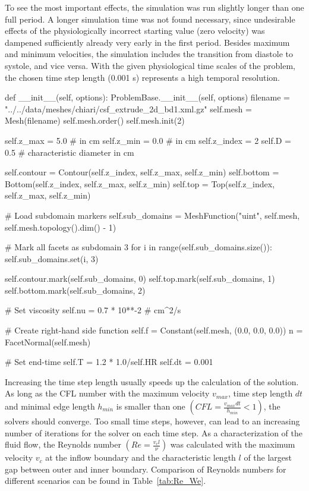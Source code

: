 To see the most important effects, the simulation was run slightly
longer than one full period. A longer simulation time was not found
necessary, since undesirable effects of the physiologically incorrect
starting value (zero velocity) was dampened sufficiently already very
early in the first period. Besides maximum and minimum velocities, the
simulation includes the transition from diastole to systole, and vice
versa.  With the given physiological time scales of the problem, the
chosen time step length (0.001 s) represents a high temporal
resolution.
\begin{python}
def __init__(self, options):
	ProblemBase.__init__(self, options)
	filename = "../../data/meshes/chiari/csf_extrude_2d_bd1.xml.gz"
	self.mesh = Mesh(filename)
	self.mesh.order()
	self.mesh.init(2)

	self.z_max = 5.0	# in cm
	self.z_min = 0.0	# in cm
	self.z_index = 2
	self.D = 0.5 		# characteristic diameter in cm

	self.contour = Contour(self.z_index, self.z_max, self.z_min)
	self.bottom = Bottom(self.z_index, self.z_max, self.z_min)
	self.top = Top(self.z_index, self.z_max, self.z_min)

	# Load subdomain markers
	self.sub_domains = MeshFunction("uint", self.mesh, self.mesh.topology().dim() - 1)

	# Mark all facets as subdomain 3
	for i in range(self.sub_domains.size()):
		self.sub_domains.set(i, 3)

	self.contour.mark(self.sub_domains, 0)
	self.top.mark(self.sub_domains, 1)
	self.bottom.mark(self.sub_domains, 2)

	# Set viscosity
	self.nu = 0.7 * 10**-2 # cm^2/s

	# Create right-hand side function
	self.f = Constant(self.mesh, (0.0, 0.0, 0.0))
	n = FacetNormal(self.mesh)

	# Set end-time
	self.T = 1.2 * 1.0/self.HR
	self.dt = 0.001
\end{python}

Increasing the time step length usually speeds up the calculation of
the solution. As long as the CFL number with the maximum velocity
$v_{max}$, time step length $dt$ and minimal edge length $h_{min}$ is
smaller than one $(CFL = \frac{v_{max} dt}{h_{min}} < 1)$, the solvers
should converge. Too small time steps, however, can lead to an
increasing number of iterations for the solver on each time step.  As
a characterization of the fluid flow, the Reynolds number $(Re =
\frac{v_c l}{\nu})$ was calculated with the maximum velocity $v_c$ at
the inflow boundary and the characteristic length $l$ of the largest
gap between outer and inner boundary. Comparison of Reynolds numbers
for different scenarios can be found in Table~\ref{tab:Re_We}.

